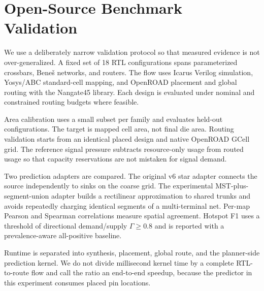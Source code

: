 \section{Open-Source Benchmark Validation}
We use a deliberately narrow validation protocol so that measured evidence is not over-generalized. A fixed set of 18 RTL configurations spans parameterized crossbars, Bene\v{s} networks, and routers. The flow uses Icarus Verilog simulation, Yosys/ABC standard-cell mapping, and OpenROAD placement and global routing with the Nangate45 library. Each design is evaluated under nominal and constrained routing budgets where feasible.

Area calibration uses a small subset per family and evaluates held-out configurations. The target is mapped cell area, not final die area. Routing validation starts from an identical placed design and native OpenROAD GCell grid. The reference signal pressure subtracts resource-only usage from routed usage so that capacity reservations are not mistaken for signal demand.

Two prediction adapters are compared. The original v6 star adapter connects the source independently to sinks on the coarse grid. The experimental MST-plus-segment-union adapter builds a rectilinear approximation to shared trunks and avoids repeatedly charging identical segments of a multi-terminal net. Per-map Pearson and Spearman correlations measure spatial agreement. Hotspot F1 uses a threshold of directional demand/supply $\Gamma\ge0.8$ and is reported with a prevalence-aware all-positive baseline.

Runtime is separated into synthesis, placement, global route, and the planner-side prediction kernel. We do not divide millisecond kernel time by a complete RTL-to-route flow and call the ratio an end-to-end speedup, because the predictor in this experiment consumes placed pin locations.
